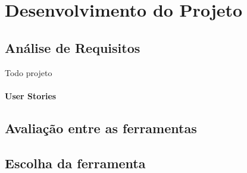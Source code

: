\chapter{Desenvolvimento do Projeto}

\section{Análise de Requisitos}

Todo projeto 

\subsubsection{User Stories}

\section{Avaliação entre as ferramentas}

\section{Escolha da ferramenta}

